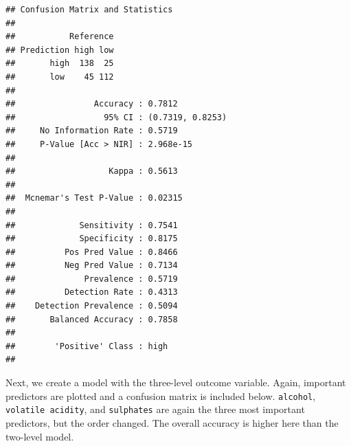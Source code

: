 \documentclass[
]{book}
\newenvironment{Shaded}{\begin{snugshade}}{\end{snugshade}}
\newcommand{\FunctionTok}[1]{\textcolor[rgb]{0.13,0.29,0.53}{\textbf{#1}}}
\newcommand{\NormalTok}[1]{#1}
\newcommand{\SpecialCharTok}[1]{\textcolor[rgb]{0.81,0.36,0.00}{\textbf{#1}}}
\begin{document}
\begin{Shaded}
\end{Shaded}

\begin{verbatim}
## Confusion Matrix and Statistics
## 
##           Reference
## Prediction high low
##       high  138  25
##       low    45 112
##                                           
##                Accuracy : 0.7812          
##                  95% CI : (0.7319, 0.8253)
##     No Information Rate : 0.5719          
##     P-Value [Acc > NIR] : 2.968e-15       
##                                           
##                   Kappa : 0.5613          
##                                           
##  Mcnemar's Test P-Value : 0.02315         
##                                           
##             Sensitivity : 0.7541          
##             Specificity : 0.8175          
##          Pos Pred Value : 0.8466          
##          Neg Pred Value : 0.7134          
##              Prevalence : 0.5719          
##          Detection Rate : 0.4313          
##    Detection Prevalence : 0.5094          
##       Balanced Accuracy : 0.7858          
##                                           
##        'Positive' Class : high            
## 
\end{verbatim}

Next, we create a model with the three-level outcome variable. Again, important predictors are plotted and a confusion matrix is included below. \texttt{alcohol}, \texttt{volatile\ acidity}, and \texttt{sulphates} are again the three most important predictors, but the order changed. The overall accuracy is higher here than the two-level model.
\end{document}
